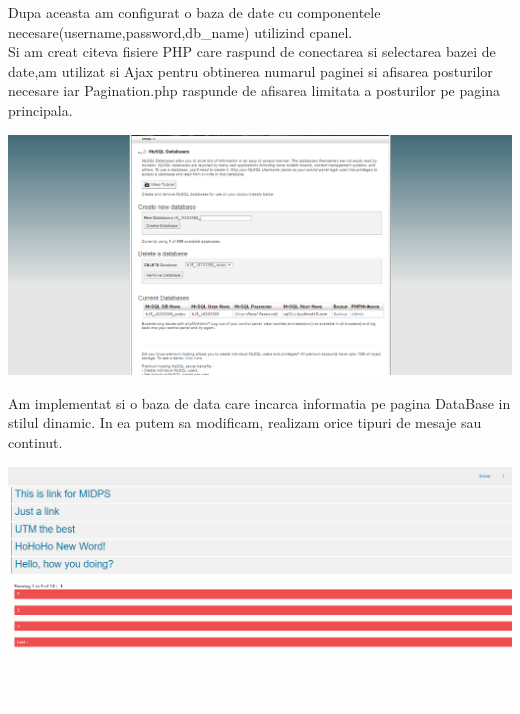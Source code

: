 Dupa aceasta am configurat o baza de date cu componentele necesare(username,password,db\_name) utilizind cpanel.\\
Si am creat citeva fisiere PHP care raspund de conectarea si selectarea bazei de date,am utilizat si Ajax pentru obtinerea numarul paginei si afisarea posturilor necesare iar Pagination.php raspunde de afisarea limitata a posturilor pe pagina principala.
\begin{center}
\includegraphics[scale=0.5]{images/5}
\end{center}


Am implementat si o baza de data care incarca informatia pe pagina DataBase in stilul dinamic. In ea putem sa modificam, realizam orice tipuri de mesaje sau continut.
\begin{center}
\includegraphics[scale=0.5]{images/6}
\end{center}
\clearpage